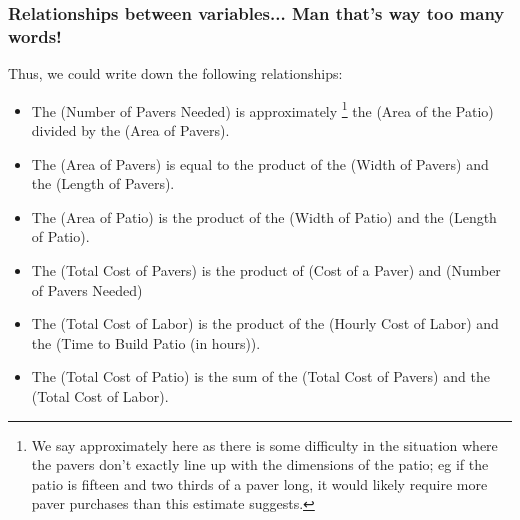 \documentclass{ximeraXloud}
\begin{document}
\subsubsection*{Relationships between variables... Man that's way too many words!}
Thus, we could write down the following relationships:
\begin{itemize}
    \item The (Number of Pavers Needed) is approximately%
    \footnote{We say approximately here as there is some difficulty in the situation where the pavers don't exactly line up with the dimensions of the patio; eg if the patio is fifteen and two thirds of a paver long, it would likely require more paver purchases than this estimate suggests.}
    the (Area of the Patio) divided by the (Area of Pavers).
    \item The (Area of Pavers) is equal to the product of the (Width of Pavers) and the (Length of Pavers).
    \item The (Area of Patio) is the product of the (Width of Patio) and the (Length of Patio).
    \item The (Total Cost of Pavers) is the product of (Cost of a Paver) and (Number of Pavers Needed)
    \item The (Total Cost of Labor) is the product of the (Hourly Cost of Labor) and the (Time to Build Patio (in hours)).
    \item The (Total Cost of Patio) is the sum of the (Total Cost of Pavers) and the (Total Cost of Labor).
\end{itemize}
\end{document}
